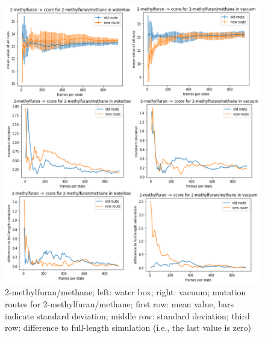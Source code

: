 \begin{figure}[!htb]
	
	\includegraphics[scale=0.9]{methylfuran_short}\caption{2-methylfuran/methane; left: water box; right: vacuum;  mutation routes for 2-methylfuran/methane; first row: mean value, bars indicate standard deviation; middle row: standard deviation; third row: difference to full-length simulation (i.e., the last value is zero)}
	\label{fig:methylfuran_short}
\end{figure}


